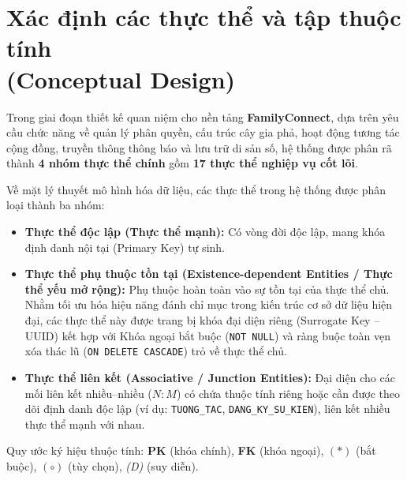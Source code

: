 \section[Xác định các thực thể và tập thuộc tính]{Xác định các thực thể và tập thuộc tính\\(Conceptual Design)}
\label{sec:1_1_thuc_the_thuoc_tinh}

Trong giai đoạn thiết kế quan niệm cho nền tảng \textbf{FamilyConnect}, dựa trên yêu cầu chức năng về quản lý phân quyền, cấu trúc cây gia phả, hoạt động tương tác cộng đồng, truyền thông thông báo và lưu trữ di sản số, hệ thống được phân rã thành \textbf{4 nhóm thực thể chính} gồm \textbf{17 thực thể nghiệp vụ cốt lõi}. 

Về mặt lý thuyết mô hình hóa dữ liệu, các thực thể trong hệ thống được phân loại thành ba nhóm:
\begin{itemize}
    \item \textbf{Thực thể độc lập (Thực thể mạnh):} Có vòng đời độc lập, mang khóa định danh nội tại (Primary Key) tự sinh.
    \item \textbf{Thực thể phụ thuộc tồn tại (Existence-dependent Entities / Thực thể yếu mở rộng):} Phụ thuộc hoàn toàn vào sự tồn tại của thực thể chủ. Nhằm tối ưu hóa hiệu năng đánh chỉ mục trong kiến trúc cơ sở dữ liệu hiện đại, các thực thể này được trang bị khóa đại diện riêng (Surrogate Key -- UUID) kết hợp với Khóa ngoại bắt buộc (\texttt{NOT NULL}) và ràng buộc toàn vẹn xóa thác lũ (\texttt{ON DELETE CASCADE}) trỏ về thực thể chủ.
    \item \textbf{Thực thể liên kết (Associative / Junction Entities):} Đại diện cho các mối liên kết nhiều--nhiều ($N:M$) có chứa thuộc tính riêng hoặc cần được theo dõi định danh độc lập (ví dụ: \texttt{TUONG\_TAC}, \texttt{DANG\_KY\_SU\_KIEN}), liên kết nhiều thực thể mạnh với nhau.
\end{itemize}

Quy ước ký hiệu thuộc tính: \textbf{PK} (khóa chính), \textbf{FK} (khóa ngoại), $(*)$ (bắt buộc), $(\circ)$ (tùy chọn), \textit{(D)} (suy diễn).

\newlength{\entnamewd}
\newcommand{\entname}[2]{%
    \settowidth{\entnamewd}{\small\textbf{#1}}%
    \ifdim\entnamewd>\linewidth
        \resizebox{\linewidth}{!}{\textbf{#1}}%
    \else
        {\small\textbf{#1}}%
    \fi
    \newline{\footnotesize\textit{(#2)}}%
}

